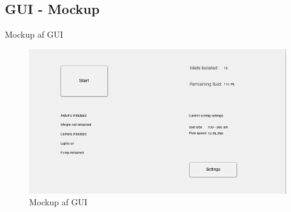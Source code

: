 \subsection{GUI - Mockup}
Mockup af GUI
\begin{figure}[H]
	\centering
	\includegraphics[width=1\textwidth]{billeder/GUI.png}
	\caption{Mockup af GUI}
	\label{fig:gui}
\end{figure}